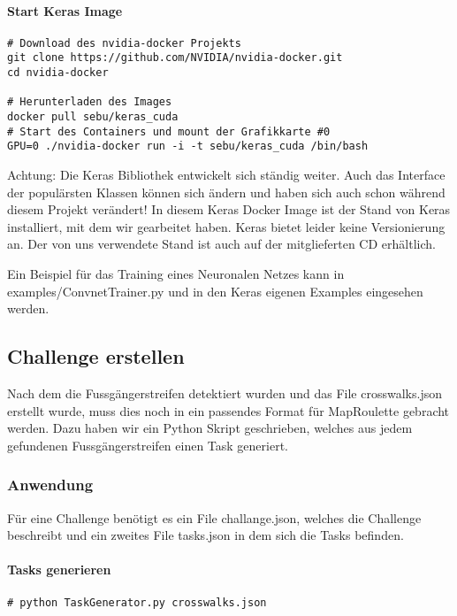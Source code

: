 \paragraph{Start Keras Image}
\begin{lstlisting}[style=BashInputStyle]
# Download des nvidia-docker Projekts
git clone https://github.com/NVIDIA/nvidia-docker.git
cd nvidia-docker

# Herunterladen des Images
docker pull sebu/keras_cuda
# Start des Containers und mount der Grafikkarte #0
GPU=0 ./nvidia-docker run -i -t sebu/keras_cuda /bin/bash
\end{lstlisting}

Achtung: Die Keras Bibliothek entwickelt sich ständig weiter. Auch das Interface der populärsten Klassen können sich ändern und haben sich auch schon während diesem Projekt verändert! In diesem Keras Docker Image ist der Stand von Keras installiert, mit dem wir gearbeitet haben. Keras bietet leider keine Versionierung an. Der von uns verwendete Stand ist auch auf der mitglieferten CD erhältlich.

Ein Beispiel für das Training eines Neuronalen Netzes kann in examples/ConvnetTrainer.py und in den Keras eigenen Examples eingesehen werden.
\newpage
\subsection{Challenge erstellen}
Nach dem die Fussgängerstreifen detektiert wurden und das File crosswalks.json erstellt wurde, muss dies noch in ein passendes Format für MapRoulette gebracht werden. Dazu haben wir ein Python Skript geschrieben, welches aus jedem gefundenen Fussgängerstreifen einen Task generiert.

\subsubsection{Anwendung}
Für eine Challenge benötigt es ein File challange.json, welches die Challenge beschreibt und ein zweites File tasks.json in dem sich die Tasks befinden.\\

\paragraph{Tasks generieren}
\begin{lstlisting}[style=BashInputStyle]
 # python TaskGenerator.py crosswalks.json
\end{lstlisting}

